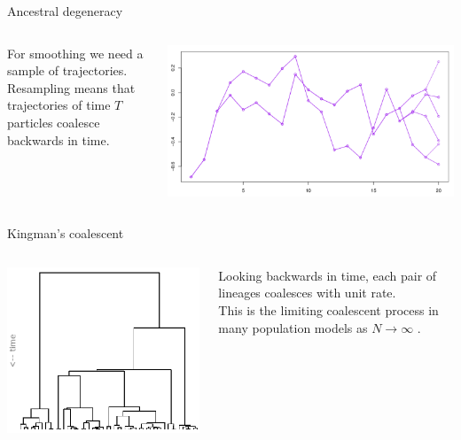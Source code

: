 \documentclass[aspectratio=169]{beamer}
\theoremstyle{definition}
\begin{document}
\begin{frame}{Ancestral degeneracy}
\begin{columns}
\begin{column}{0.35\textwidth}
For smoothing we need a sample of trajectories.\\[7pt]
Resampling means that trajectories of time $T$ particles coalesce backwards in time.
\end{column}
\begin{column}{0.6\textwidth}
\includegraphics[width=\textwidth]{../degeneracy.pdf}
\end{column}
\end{columns}
\end{frame}

\begin{frame}{Kingman's coalescent}
\begin{columns}
\begin{column}{0.45\textwidth}
\includegraphics[width=\textwidth]{../kingman.png}
\end{column}
\begin{column}{0.45\textwidth}
Looking backwards in time, each pair of lineages coalesces with unit rate.\\[7pt]
\pause
This is the limiting coalescent process in many population models as $N\to\infty$ \cite{kingman1982coal, mohle1998}.
\end{column}
\end{columns}
\end{frame}
\end{document}

